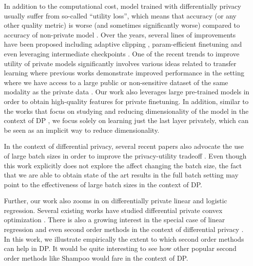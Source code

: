 \documentclass[letterpaper]{article} \usepackage{fullpage}
\begin{document}
In addition to the computational cost, model trained with differentially privacy usually suffer from so-called ``utility loss'', which means that accuracy (or any other quality metric) is worse (and sometimes significantly worse) compared to accuracy of non-private model \citep{doorman_notallnoise_2021,klause2022differentially}. Over the years, several lines of improvements have been proposed including adaptive clipping \citep{pichapati2019adaclip, thakkar2019differentially,Bu2022AutomaticCD,Golatkar2022}, param-efficient finetuning \cite{Yu2022DifferentiallyPF,mehta2022large,Bu2022DifferentiallyPB,Cattan2022FineTuningWD,Li2022WhenDD} and even leveraging intermediate checkpoints \citep{dm_transfer_2022,Shejwalkar2022RecyclingSI}. One of the recent trends to improve utility of private models significantly involves various ideas related to transfer learning where previous works demonstrate improved performance in the setting where we have access to a large public or non-sensitive dataset of the same modality as the private data \cite{kurakin2022training,dm_transfer_2022,mehta2022large,tramer2021dpfeatures,Yu2022DifferentiallyPF,li2022llmdp,kurakin2022training,hoory_2021_llm}. Our work also leverages large pre-trained models in order to obtain high-quality features for private finetuning. In addition, similar to the works that focus on studying and reducing dimensionality of the model in the context of DP \citep{Li2022WhenDD,Golatkar2022,yu_YZCL21,zhang2021wide,zhou2020bypassing}, we focus solely on learning just the last layer privately, which can be seen as an implicit way to reduce dimensionality. 

In the context of differential privacy, several recent papers also advocate the use of large batch sizes in order to improve the privacy-utility tradeoff \citep{mehta2022large,McMahan2018learning,anil21_dpbert,doorman_notallnoise_2021,hoory_2021_llm,liu2021mldoctor,kurakin2022training}. Even though this work explicitly does not explore the affect changing the batch size, the fact that we are able to obtain state of the art results in the full batch setting may point to the effectiveness of large batch sizes in the context of DP.

Further, our work also zooms in on differentially private linear and logistic regression. Several existing works have studied differential private convex optimization \citep{chaudhuri2011differentially,kifer2012private,song2013stochastic,Bassily_2014, wu2016bolton, mcmahan2017learning,bassily2019private,iyengar2019towards, feldman2020hiding,bassily2020stability,song2020characterizing,andrew2021differentially}. There is also a growing interest in the special case of linear regression \citep{smith2017interaction,pmlr-v98-sheffet19a,liu2021differential,cai2021cost,pmlr-v178-varshney22a} and even second order methods in the context of differential privacy \cite{avellamedina2021differentially,chien2021private}. In this work, we illustrate empirically the extent to which second order methods can help in DP. It would be quite interesting to see how other popular second order methods like Shampoo \cite{gupta2018shampoo,anil2020scalable} would fare in the context of DP.
\end{document}
